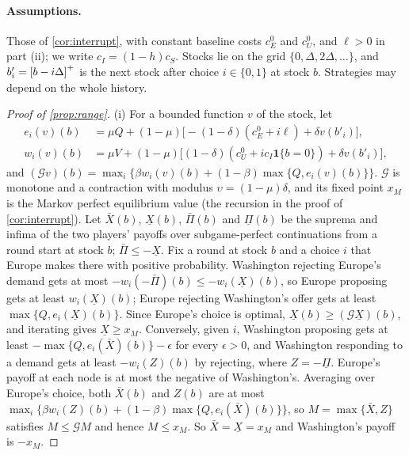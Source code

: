 \paragraph{Assumptions.} Those of \cref{cor:interrupt}, with constant baseline costs $c^0_E$ and $c^0_U$, and $\ell>0$ in part (ii); we write $c_I=(1-h)c_S$. Stocks lie on the grid $\{0,\Delta,2\Delta,\dots\}$, and $b'_i=\left[b-i\Delta\right]^{+}$ is the next stock after choice $i\in\{0,1\}$ at stock $b$. Strategies may depend on the whole history.

\begin{proof}[Proof of \cref{prop:range}]
(i) For a bounded function $v$ of the stock, let
\begin{align*}
e_i(v)(b)&=\mu Q+(1-\mu)\big[-(1-\delta)(c^0_E+i\ell)+\delta v(b'_i)\big],\\
w_i(v)(b)&=\mu V+(1-\mu)\big[(1-\delta)(c^0_U+ic_I\mathbf 1\{b=0\})+\delta v(b'_i)\big],
\end{align*}
and $(\mathcal G v)(b)=\max_{i}\{\beta w_i(v)(b)+(1-\beta)\max\{Q,e_i(v)(b)\}\}$. $\mathcal G$ is monotone and a contraction with modulus $\upsilon=(1-\mu)\delta$, and its fixed point $x_M$ is the Markov perfect equilibrium value (the recursion in the proof of \cref{cor:interrupt}). Let $\bar X(b)$, $\underline X(b)$, $\bar\Pi(b)$ and $\underline\Pi(b)$ be the suprema and infima of the two players' payoffs over subgame-perfect continuations from a round start at stock $b$; $\bar\Pi\le-\underline X$. Fix a round at stock $b$ and a choice $i$ that Europe makes there with positive probability. Washington rejecting Europe's demand gets at most $-w_i(-\bar\Pi)(b)\le-w_i(\underline X)(b)$, so Europe proposing gets at least $w_i(\underline X)(b)$; Europe rejecting Washington's offer gets at least $\max\{Q,e_i(\underline X)(b)\}$. Since Europe's choice is optimal, $\underline X(b)\ge(\mathcal G\underline X)(b)$, and iterating gives $\underline X\ge x_M$. Conversely, given $i$, Washington proposing gets at least $-\max\{Q,e_i(\bar X)(b)\}-\epsilon$ for every $\epsilon>0$, and Washington responding to a demand gets at least $-w_i(Z)(b)$ by rejecting, where $Z=-\underline\Pi$. Europe's payoff at each node is at most the negative of Washington's. Averaging over Europe's choice, both $\bar X(b)$ and $Z(b)$ are at most $\max_i\{\beta w_i(Z)(b)+(1-\beta)\max\{Q,e_i(\bar X)(b)\}\}$, so $M=\max\{\bar X,Z\}$ satisfies $M\le\mathcal G M$ and hence $M\le x_M$. So $\bar X=\underline X=x_M$ and Washington's payoff is $-x_M$.


\end{proof}
